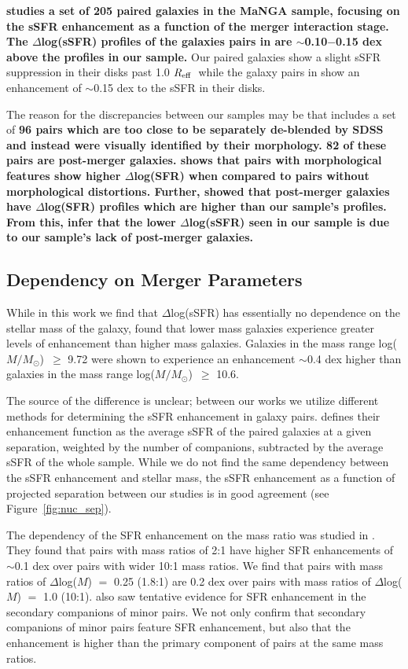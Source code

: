 \documentclass[iop,revtex4,twocolumn,apj,numberedappendix,appendixfloats]{emulateapj}
\newcommand{\reff}{$R_{\rm eff}$}
\newcommand{\logm}{log($M/M_{\odot}$)}
\begin{document}
\textbf{\citet{Pan:2019} studies a set of 205 paired galaxies in the MaNGA sample, focusing on the sSFR enhancement as a function of the merger interaction stage. The $\Delta$log(sSFR) profiles of the galaxies pairs in \citet{Pan:2019} are $\sim$0.10$-$0.15 dex above the profiles in our sample.} Our paired galaxies show a slight sSFR suppression in their disks past 1.0 \reff\ while the galaxy pairs in \citet{Pan:2019} show an enhancement of $\sim$0.15 dex to the sSFR in their disks. 

The reason for the discrepancies between our samples may be that \citet{Pan:2019} includes a set of \textbf{96 pairs which are too close to be separately de-blended by SDSS and instead were visually identified by their morphology. 82 of these pairs are post-merger galaxies. \citet{Pan:2019} shows that pairs with morphological features show higher $\Delta$log(SFR) when compared to pairs without morphological distortions. Further, \citet{Thorp:2019} showed that post-merger galaxies have $\Delta$log(SFR) profiles which are higher than our sample's profiles. From this, infer that the lower $\Delta$log(sSFR) seen in our sample is due to our sample's lack of post-merger galaxies. }

\subsection{Dependency on Merger Parameters}

While in this work we find that $\Delta$log(sSFR) has essentially no dependence on the stellar mass of the galaxy, \citet{Li:2008} found that lower mass galaxies experience greater levels of enhancement than higher mass galaxies. Galaxies in the mass range \logm\ $\ge$ 9.72 were shown to experience an enhancement $\sim$0.4 dex higher than galaxies in the mass range \logm\ $\ge$ 10.6. 

The source of the difference is unclear; between our works we utilize different methods for determining the sSFR enhancement in galaxy pairs. \citet{Li:2008} defines their enhancement function as the average sSFR of the paired galaxies at a given separation, weighted by the number of companions, subtracted by the average sSFR of the whole sample. While we do not find the same dependency between the sSFR enhancement and stellar mass, the sSFR enhancement as a function of projected separation between our studies is in good agreement (see Figure~\ref{fig:nuc_sep}).

The dependency of the SFR enhancement on the mass ratio was studied in \citet{Ellison:2008}. They found that pairs with mass ratios of 2:1 have higher SFR enhancements of $\sim$0.1 dex over pairs with wider 10:1 mass ratios. We find that pairs with mass ratios of $\Delta$log($M$) $=$ 0.25 (1.8:1) are 0.2 dex over pairs with mass ratios of $\Delta$log($M$) $=$ 1.0 (10:1). \citet{Ellison:2008} also saw tentative evidence for SFR enhancement in the secondary companions of minor pairs. We not only confirm that secondary companions of minor pairs feature SFR enhancement, but also that the enhancement is higher than the primary component of pairs at the same mass ratios. 
\end{document}
